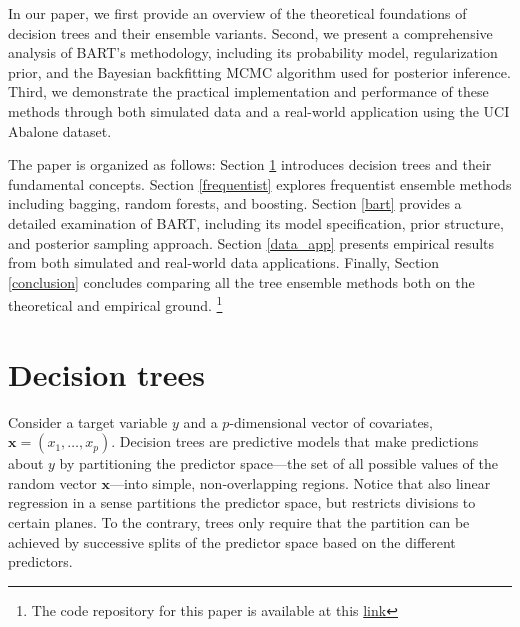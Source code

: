 \documentclass[a4paper,11pt]{article}
\begin{document}
In our paper, we first provide an overview of the theoretical foundations of decision trees and their ensemble variants. Second, we present a comprehensive analysis of BART's methodology, including its probability model, regularization prior, and the Bayesian backfitting MCMC algorithm used for posterior inference. Third, we demonstrate the practical implementation and performance of these methods through both simulated data and a real-world application using the UCI Abalone dataset.

The paper is organized as follows: Section \ref{decision} introduces decision trees and their fundamental concepts. Section \ref{frequentist} explores frequentist ensemble methods including bagging, random forests, and boosting. Section \ref{bart} provides a detailed examination of BART, including its model specification, prior structure, and posterior sampling approach. Section \ref{data_app} presents empirical results from both simulated and real-world data applications. Finally, Section \ref{conclusion} concludes comparing all the tree ensemble methods both on the theoretical and empirical ground. \footnote{The code repository for this paper is available at this \href{https://github.com/giuliofrey/bart}{link}}


\section{Decision trees}
\label{decision}

Consider a target variable \( y \) and a \( p \)-dimensional vector of covariates, \( \mathbf{x} = (x_1, \ldots, x_p) \). Decision trees are predictive models that make predictions about \( y \) by partitioning the predictor space—the set of all possible values of the random vector \( \mathbf{x} \)—into simple, non-overlapping regions. Notice that also linear
regression in a sense partitions the predictor space, but restricts divisions to certain planes. To the contrary, trees only require that the partition can be achieved by successive splits of the predictor space based on the different predictors. 
\end{document}
